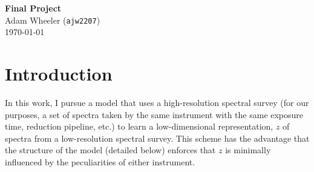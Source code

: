 \documentclass[12pt]{article}
\begin{document}
\begin{flushleft}
\textbf{Final Project} \\
Adam Wheeler (\texttt{ajw2207}) \\
\today
\end{flushleft}
\normalsize
%

\section{Introduction}
In this work, I pursue a model that uses a high-resolution spectral survey (for our purposes, a set of spectra taken by the same instrument with the same exposure time, reduction pipeline, etc.) to learn a low-dimensional representation, $z$ of spectra from a low-resolution spectral survey.
This scheme has the advantage that the structure of the model (detailed below) enforces that $z$ is minimally influenced by the peculiarities of either instrument.
\end{document}
